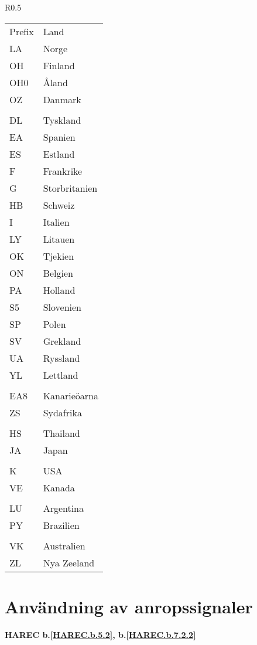 \begin{wraptable}{R}{0.5\textwidth}
  \begin{tabular}{ll}
    Prefix & Land \\
    LA & Norge \\
    OH & Finland \\
    OH0 & Åland \\
    OZ & Danmark \\
    & & \\
    DL & Tyskland \\
    EA & Spanien \\
    ES & Estland \\
    F & Frankrike \\
    G & Storbritanien \\
    HB & Schweiz \\
    I & Italien \\
    LY & Litauen \\
    OK & Tjekien \\
    ON & Belgien \\
    PA & Holland \\
    S5 & Slovenien \\
    SP & Polen \\
    SV & Grekland \\
    UA & Ryssland \\
    YL & Lettland \\
    & & \\
    EA8 & Kanarieöarna \\
    ZS & Sydafrika \\
    & & \\
    HS & Thailand \\
    JA & Japan \\
    & & \\
    K & USA \\
    VE & Kanada \\
    & & \\
    LU & Argentina \\
    PY & Brazilien \\
    & & \\
    VK & Australien \\
    ZL & Nya Zeeland \\
\end{tabular}
\end{wraptable}


\section{Användning av anropssignaler}
\textbf{HAREC
  b.\ref{HAREC.b.5.2}\label{myHAREC.b.5.2},
  b.\ref{HAREC.b.7.2.2}\label{myHAREC.b.7.2.2}
}


